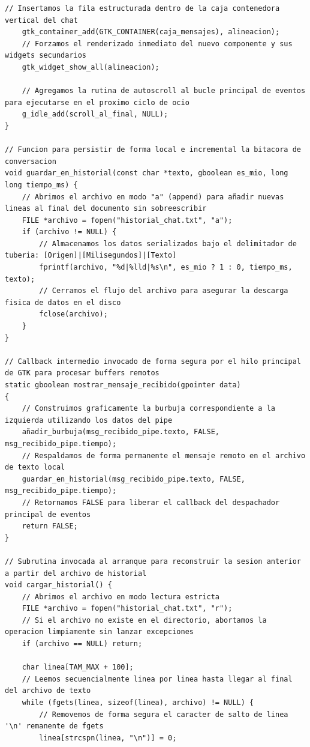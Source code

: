 \begin{lstlisting}[style=estiloC, caption={Archivo del Front-End (conexion P2P)}]
    // Insertamos la fila estructurada dentro de la caja contenedora vertical del chat
    gtk_container_add(GTK_CONTAINER(caja_mensajes), alineacion);
    // Forzamos el renderizado inmediato del nuevo componente y sus widgets secundarios
    gtk_widget_show_all(alineacion);

    // Agregamos la rutina de autoscroll al bucle principal de eventos para ejecutarse en el proximo ciclo de ocio
    g_idle_add(scroll_al_final, NULL);
}

// Funcion para persistir de forma local e incremental la bitacora de conversacion
void guardar_en_historial(const char *texto, gboolean es_mio, long long tiempo_ms) {
    // Abrimos el archivo en modo "a" (append) para añadir nuevas lineas al final del documento sin sobreescribir
    FILE *archivo = fopen("historial_chat.txt", "a"); 
    if (archivo != NULL) {
        // Almacenamos los datos serializados bajo el delimitador de tuberia: [Origen]|[Milisegundos]|[Texto]
        fprintf(archivo, "%d|%lld|%s\n", es_mio ? 1 : 0, tiempo_ms, texto);
        // Cerramos el flujo del archivo para asegurar la descarga fisica de datos en el disco
        fclose(archivo);
    }
}

// Callback intermedio invocado de forma segura por el hilo principal de GTK para procesar buffers remotos
static gboolean mostrar_mensaje_recibido(gpointer data)
{
    // Construimos graficamente la burbuja correspondiente a la izquierda utilizando los datos del pipe
    añadir_burbuja(msg_recibido_pipe.texto, FALSE, msg_recibido_pipe.tiempo);
    // Respaldamos de forma permanente el mensaje remoto en el archivo de texto local
    guardar_en_historial(msg_recibido_pipe.texto, FALSE, msg_recibido_pipe.tiempo);
    // Retornamos FALSE para liberar el callback del despachador principal de eventos
    return FALSE;
}

// Subrutina invocada al arranque para reconstruir la sesion anterior a partir del archivo de historial
void cargar_historial() {
    // Abrimos el archivo en modo lectura estricta
    FILE *archivo = fopen("historial_chat.txt", "r"); 
    // Si el archivo no existe en el directorio, abortamos la operacion limpiamente sin lanzar excepciones
    if (archivo == NULL) return; 

    char linea[TAM_MAX + 100]; 
    // Leemos secuencialmente linea por linea hasta llegar al final del archivo de texto
    while (fgets(linea, sizeof(linea), archivo) != NULL) {
        // Removemos de forma segura el caracter de salto de linea '\n' remanente de fgets
        linea[strcspn(linea, "\n")] = 0;


\end{lstlisting}
